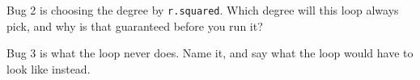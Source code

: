 \documentclass[11pt]{article}
\newcommand{\answerspace}[1]{\vspace{#1}}
\begin{document}
\begin{questions}
\begin{parts}
\item Bug 2 is choosing the degree by \texttt{r.squared}. Which degree will this loop always pick,
and why is that guaranteed before you run it?
\answerspace{4em}

\item Bug 3 is what the loop never does. Name it, and say what the loop would have to look like
instead.
\answerspace{4.5em}
\end{parts}

\end{questions}
\end{document}

